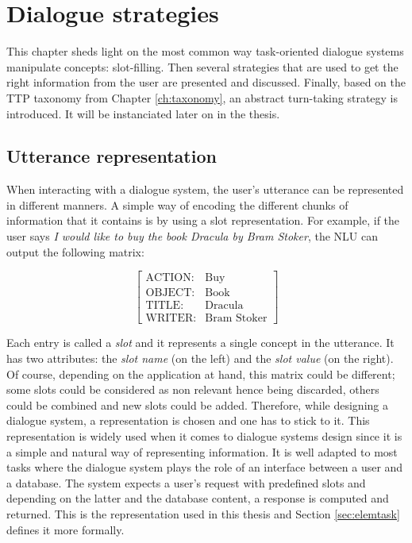 \chapter{Dialogue strategies}
\label{ch:strategies}

        This chapter sheds light on the most common way task-oriented dialogue systems manipulate concepts: slot-filling. Then several strategies that are used to get the right information from the user are presented and discussed. Finally, based on the TTP taxonomy from Chapter \ref{ch:taxonomy}, an abstract turn-taking strategy is introduced. It will be instanciated later on in the thesis.

\section{Utterance representation}
\label{sec:represent}
	
	When interacting with a dialogue system, the user's utterance can be represented in different manners. A simple way of encoding the different chunks of information that it contains is by using a slot representation. For example, if the user says \textit{I would like to buy the book Dracula by Bram Stoker}, the NLU can output the following matrix:
	
		$$
		\begin{bmatrix}
			\text{ACTION:} & \text{Buy} \\
			\text{OBJECT:} & \text{Book} \\
			\text{TITLE:} & \text{Dracula} \\
			\text{WRITER:} & \text{Bram Stoker}
		\end{bmatrix}
		$$
	
	Each entry is called a \textit{slot} and it represents a single concept in the utterance. It has two attributes: the \textit{slot name} (on the left) and the \textit{slot value} (on the right). Of course, depending on the application at hand, this matrix could be different; some slots could be considered as non relevant hence being discarded, others could be combined and new slots could be added. Therefore, while designing a dialogue system, a representation is chosen and one has to stick to it. This representation is widely used when it comes to dialogue systems design since it is a simple and natural way of representing information. It is well adapted to most tasks where the dialogue system plays the role of an interface between a user and a database. The system expects a user's request with predefined slots and depending on the latter and the database content, a response is computed and returned. This is the representation used in this thesis and Section \ref{sec:elemtask} defines it more formally.


